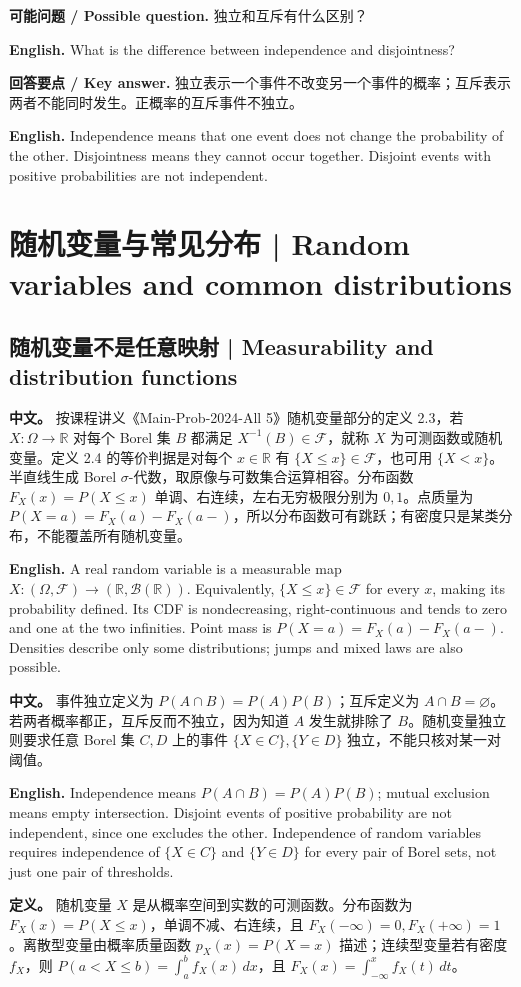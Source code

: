 \documentclass[UTF8,11pt,a4paper]{ctexart}
\newcommand{\EN}[1]{\par\noindent\textbf{English.} #1\par}
\newcommand{\ASK}[4]{\par\noindent\textbf{可能问题 / Possible question.} #1\par\EN{#2}\noindent\textbf{回答要点 / Key answer.} #3\par\EN{#4}\medskip}
\newcommand{\APS}[2]{\par\noindent\textbf{中文。} #1\par\noindent\textbf{English.} #2\par\smallskip}
\begin{document}
\ASK{独立和互斥有什么区别？}{What is the difference between independence and disjointness?}{独立表示一个事件不改变另一个事件的概率；互斥表示两者不能同时发生。正概率的互斥事件不独立。}{Independence means that one event does not change the probability of the other. Disjointness means they cannot occur together. Disjoint events with positive probabilities are not independent.}

\section{随机变量与常见分布 | Random variables and common distributions}
\subsection{随机变量不是任意映射 | Measurability and distribution functions}
\APS{按课程讲义《Main-Prob-2024-All 5》随机变量部分的定义 2.3，若 $X:\Omega\to\mathbb R$ 对每个 Borel 集 $B$ 都满足 $X^{-1}(B)\in\mathcal F$，就称 $X$ 为可测函数或随机变量。定义 2.4 的等价判据是对每个 $x\in\mathbb R$ 有 $\{X\le x\}\in\mathcal F$，也可用 $\{X<x\}$。半直线生成 Borel $\sigma$-代数，取原像与可数集合运算相容。分布函数 $F_X(x)=P(X\le x)$ 单调、右连续，左右无穷极限分别为 $0,1$。点质量为 $P(X=a)=F_X(a)-F_X(a-)$，所以分布函数可有跳跃；有密度只是某类分布，不能覆盖所有随机变量。}{A real random variable is a measurable map $X:(\Omega,\mathcal F)\to(\mathbb R,\mathcal B(\mathbb R))$. Equivalently, $\{X\le x\}\in\mathcal F$ for every $x$, making its probability defined. Its CDF is nondecreasing, right-continuous and tends to zero and one at the two infinities. Point mass is $P(X=a)=F_X(a)-F_X(a-)$. Densities describe only some distributions; jumps and mixed laws are also possible.}
\APS{事件独立定义为 $P(A\cap B)=P(A)P(B)$；互斥定义为 $A\cap B=\varnothing$。若两者概率都正，互斥反而不独立，因为知道 $A$ 发生就排除了 $B$。随机变量独立则要求任意 Borel 集 $C,D$ 上的事件 $\{X\in C\},\{Y\in D\}$ 独立，不能只核对某一对阈值。}{Independence means $P(A\cap B)=P(A)P(B)$; mutual exclusion means empty intersection. Disjoint events of positive probability are not independent, since one excludes the other. Independence of random variables requires independence of $\{X\in C\}$ and $\{Y\in D\}$ for every pair of Borel sets, not just one pair of thresholds.}

\noindent\textbf{定义。} 随机变量 $X$ 是从概率空间到实数的可测函数。分布函数为 $F_X(x)=P(X\le x)$，单调不减、右连续，且 $F_X(-\infty)=0,F_X(+\infty)=1$。离散型变量由概率质量函数 $p_X(x)=P(X=x)$ 描述；连续型变量若有密度 $f_X$，则 $P(a<X\le b)=\int_a^bf_X(x)\,dx$，且 $F_X(x)=\int_{-\infty}^xf_X(t)\,dt$。
\end{document}
